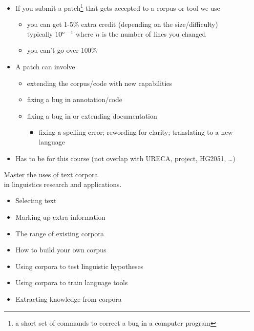 \documentclass[a4paper,landscape,headrule,footrule]{foils}
\begin{document}

\begin{itemize}
\item If you submit a patch\footnote{a short set of commands to correct a bug in a computer program} that gets accepted to a corpus or tool we use
  \begin{itemize}
  \item you can get 1-5\% extra credit (depending on the size/difficulty)
    \\ typically 10$^{n-1}$ where $n$ is the number of lines you changed
  \item you can't go over 100\%
  \end{itemize}
\item A patch can involve
  \begin{itemize}
  \item extending the corpus/code with new capabilities
  \item fixing a bug in annotation/code
  \item fixing a bug in or extending documentation
    \begin{itemize}
    \item fixing a spelling error; rewording for clarity; translating to a new language
    \end{itemize}
  \end{itemize}
\item Has to be for this course (not overlap with URECA, project, HG2051, \ldots)
\end{itemize}



\begin{center}
  \LARGE 
Master the uses of text corpora 
\\ in linguistics research and applications.
\end{center}
\begin{itemize}\addtolength{\itemsep}{-1ex}
\item Selecting text
\item Marking up extra information
\item The range of existing corpora
\item How to build your own corpus
\item Using corpora to test linguistic hypotheses
\item Using corpora to train language tools
\item Extracting knowledge from corpora
\end{itemize}
\end{document}
